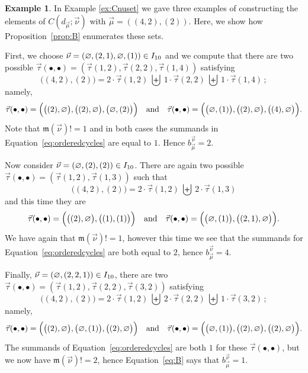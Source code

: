 \documentclass[10pt]{amsart}
\theoremstyle{definition}
\newtheorem{example}[theorem]{Example}
\theoremstyle{remark}
\newcommand{\epart}{\text{\footnotesize$\varnothing$}}
\begin{document}
\begin{example}  In Example \ref{ex:Cnuset} we gave three examples of
constructing the elements of $C( d_{\vec{\mu}}; \vec{\nu})$ with $\vec{\mu} = ((4,2), (2))$.
Here, we show
how Proposition~\ref{prop:B} enumerates these sets.

First, we choose $\vec{\nu} = (\epart, (2,1), \epart, (1)) \in I_{10}$
and we compute that there are two possible
$\vec{\tau}(\bullet, \bullet) = (\vec{\tau}(1,2), \vec{\tau}(2,2), \vec{\tau}(1,4))$
satisfying
\[
    \big((4, 2), (2)\big) =
    2 \cdot \vec{\tau}(1,2)~\biguplus~1 \cdot \vec{\tau}(2,2)~\biguplus~1 \cdot \vec{\tau}(1,4) \,;
\]
namely,
\begin{equation*}
    \vec{\tau}(\bullet, \bullet) = \Big(\big((2), \epart\big), \big((2), \epart\big), \big(\epart, (2)\big)\Big)
    \quad\text{and}\quad
    \vec{\tau}(\bullet, \bullet) = \Big(\big(\epart, (1)\big), \big((2), \epart \big), \big((4), \epart\big)\Big).
\end{equation*}
Note that $\mathfrak{m}(\vec{\nu})! = 1$ and in both cases
the summands in Equation~\eqref{eq:orderedcycles} are equal to $1$.
Hence $b_{\vec{\mu}}^{\vec{\nu}} = 2$.

Now consider $\vec{\nu} = (\epart, (2), (2)) \in I_{10}$.
There are again two possible $\vec{\tau}(\bullet, \bullet) = (\vec{\tau}(1,2), \vec{\tau}(1,3))$
such that
\[
\big((4, 2), (2)\big) = 2 \cdot \vec{\tau}(1,2)~\biguplus~2 \cdot \vec{\tau}(1,3)
\]
and this time they are
\begin{equation*}
    \vec{\tau}(\bullet, \bullet) = \Big(\big((2), \epart\big), \big((1), (1)\big)\Big)
    \quad\text{and}\quad
    \vec{\tau}(\bullet, \bullet) = \Big(\big(\epart, (1)\big), \big((2, 1), \epart\big)\Big).
\end{equation*}
We have again that $\mathfrak{m}(\vec{\nu})! = 1$,
however this time we see that the summands for Equation~\eqref{eq:orderedcycles}
are both equal to $2$, hence $b_{\vec{\mu}}^{\vec{\nu}} = 4$.

Finally,
$\vec{\nu} = (\epart, (2,2,1)) \in I_{10}$, there are two
$\vec{\tau}(\bullet, \bullet) = (\vec{\tau}(1,2), \vec{\tau}(2,2), \vec{\tau}(3,2))$ satisfying
\[
\big((4, 2), (2)\big) =
2 \cdot \vec{\tau}(1,2)~\biguplus~2 \cdot \vec{\tau}(2,2)~\biguplus~1 \cdot \vec{\tau}(3,2) \,;
\]
namely,
\begin{equation*}
    \vec{\tau}(\bullet, \bullet) = \Big(\big((2), \epart\big), \big(\epart, (1)\big), \big((2), \epart\big)\Big)
    \quad\text{and}\quad
    \vec{\tau}(\bullet, \bullet) = \Big(\big(\epart, (1)\big), \big((2), \epart \big), \big((2), \epart\big)\Big).
\end{equation*}
The summands of Equation~\eqref{eq:orderedcycles} are both $1$ for these $\vec{\tau}(\bullet, \bullet)$,
but we now have $\mathfrak{m}(\vec{\nu})! = 2$,
hence Equation~\eqref{eq:B} says that $b_{\vec{\mu}}^{\vec{\nu}} = 1$.
\end{example}
\end{document}
